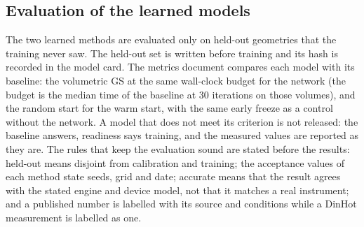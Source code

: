 \subsection{Evaluation of the learned models}\label{sec:protocol-learned}

The two learned methods are evaluated only on held-out geometries that the training never saw. The held-out set is written before training and its hash is recorded in the model card. The metrics document compares each model with its baseline: the volumetric GS at the same wall-clock budget for the network (the budget is the median time of the baseline at 30 iterations on those volumes), and the random start for the warm start, with the same early freeze as a control without the network. A model that does not meet its criterion is not released: the baseline answers, readiness says training, and the measured values are reported as they are. The rules that keep the evaluation sound are stated before the results: held-out means disjoint from calibration and training; the acceptance values of each method state seeds, grid and date; accurate means that the result agrees with the stated engine and device model, not that it matches a real instrument; and a published number is labelled with its source and conditions while a DinHot measurement is labelled as one.
